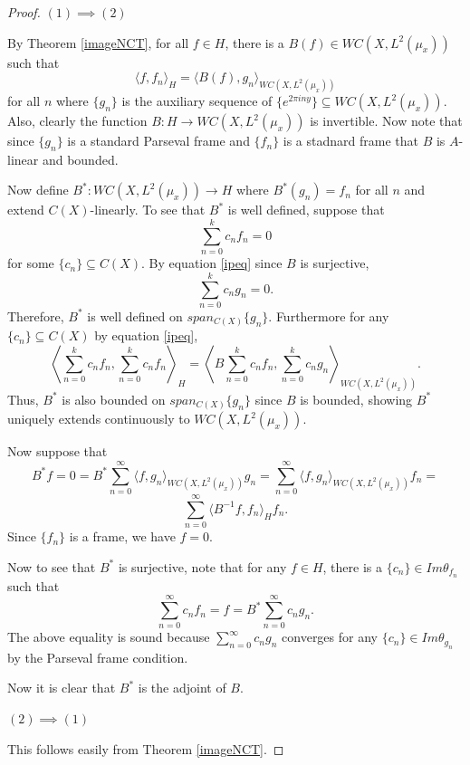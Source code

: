 \documentclass[11pt]{amsart}
\theoremstyle{definition}
\numberwithin{equation}{section}
\begin{document}
\begin{proof}
$(1)\implies (2)$

By Theorem \ref{imageNCT}, for all $f\in H$, there is a $B(f)\in WC(X, L^{2}(\mu_{x}))$ such that
\begin{equation}\label{ipeq}
\langle f, f_{n}\rangle_{H} =\langle B(f), g_{n}\rangle_{WC(X, L^{2}(\mu_{x}))} 
\end{equation} for all $n$ where $\{g_{n}\}$ is the auxiliary sequence of $\{e^{2\pi i ny}\}\subseteq WC(X, L^{2}(\mu_{x}))$. Also, clearly the function $B: H\to WC(X, L^{2}(\mu_{x}))$ is invertible. Now note that since $\{g_{n}\}$ is a standard Parseval frame and $\{f_{n}\}$ is a stadnard frame that $B$ is $A$-linear and bounded.

Now define $B^{*}: WC(X, L^{2}(\mu_{x}))\to H$ where $B^{*}(g_{n})=f_{n}$ for all $n$ and extend $C(X)$-linearly. To see that $B^{*}$ is well defined,
suppose that
$$\sum_{n=0}^{k}c_{n}f_{n}=0$$ for some $\{c_{n}\}\subseteq C(X)$. By equation \ref{ipeq} since $B$ is surjective,
$$\sum_{n=0}^{k}c_{n}g_{n}=0.$$ Therefore, $B^{*}$ is well defined on $span_{C(X)}\{g_{n}\}$.
Furthermore for any $\{c_{n}\}\subseteq C(X)$ by equation \ref{ipeq},
$$\left \langle \sum_{n=0}^{k}c_{n}f_{n}, \sum_{n=0}^{k}c_{n}f_{n} \right\rangle_{H}=\left\langle B\sum_{n=0}^{k}c_{n}f_{n},\sum_{n=0}^{k}c_{n}g_{n} \right\rangle_{WC(X, L^{2}(\mu_{x}))}.$$
Thus, $B^{*}$ is also bounded on $span_{C(X)}\{g_{n}\}$ since $B$ is bounded, showing $B^{*}$ uniquely extends continuously to $WC(X, L^{2}(\mu_{x}))$.

Now suppose that $$B^{*}f=0=B^{*}\sum_{n=0}^{\infty}\langle f, g_{n}\rangle_{WC(X, L^{2}(\mu_{x}))}g_{n}=\sum_{n=0}^{\infty}\langle f, g_{n}\rangle_{WC(X, L^{2}(\mu_{x}))}f_{n}=$$
$$\sum_{n=0}^{\infty}\langle B^{-1}f, f_{n}\rangle_{H}f_{n}.$$
Since $\{f_{n}\}$ is a frame, we have $f=0$.

Now to see that $B^{*}$ is surjective, note that for any $f\in H$, there is a $\{c_{n}\}\in Im\theta_{f_{n}}$ such that
$$\sum_{n=0}^{\infty}c_{n}f_{n}=f=B^{*}\sum_{n=0}^{\infty}c_{n}g_{n}.$$ The above equality is sound because $\sum_{n=0}^{\infty}c_{n}g_{n}$ converges for any $\{c_{n}\}\in Im\theta_{g_{n}}$ by the Parseval frame condition.

Now it is clear that $B^{*}$ is the adjoint of $B$.

$(2)\implies (1)$

This follows easily from Theorem \ref{imageNCT}.
\end{proof}
\end{document}
